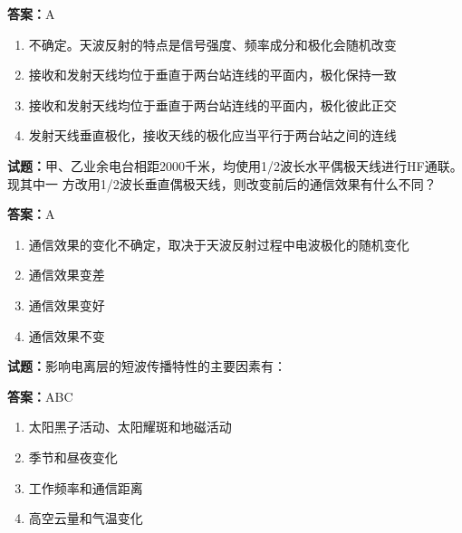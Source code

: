 \documentclass{ctexbook}
\begin{document}
\textbf{答案：}A 

\begin{enumerate}[leftmargin=3em]
  \item 不确定。天波反射的特点是信号强度、频率成分和极化会随机改变 

  \item 接收和发射天线均位于垂直于两台站连线的平面内，极化保持一致 

  \item 接收和发射天线均位于垂直于两台站连线的平面内，极化彼此正交 

  \item 发射天线垂直极化，接收天线的极化应当平行于两台站之间的连线 

\end{enumerate}





\vspace{1em}

\textbf{试题：}甲、乙业余电台相距2000千米，均使用1/2波长水平偶极天线进行HF通联。现其中一
方改用1/2波长垂直偶极天线，则改变前后的通信效果有什么不同？ 

\textbf{答案：}A 

\begin{enumerate}[leftmargin=3em]
  \item 通信效果的变化不确定，取决于天波反射过程中电波极化的随机变化 

  \item 通信效果变差 

  \item 通信效果变好 

  \item 通信效果不变 

\end{enumerate}






\vspace{1em}

\textbf{试题：}影响电离层的短波传播特性的主要因素有： 

\textbf{答案：}ABC 

\begin{enumerate}[leftmargin=3em]
  \item 太阳黑子活动、太阳耀斑和地磁活动 

  \item 季节和昼夜变化 

  \item 工作频率和通信距离 

  \item 高空云量和气温变化 

\end{enumerate}
\end{document}
